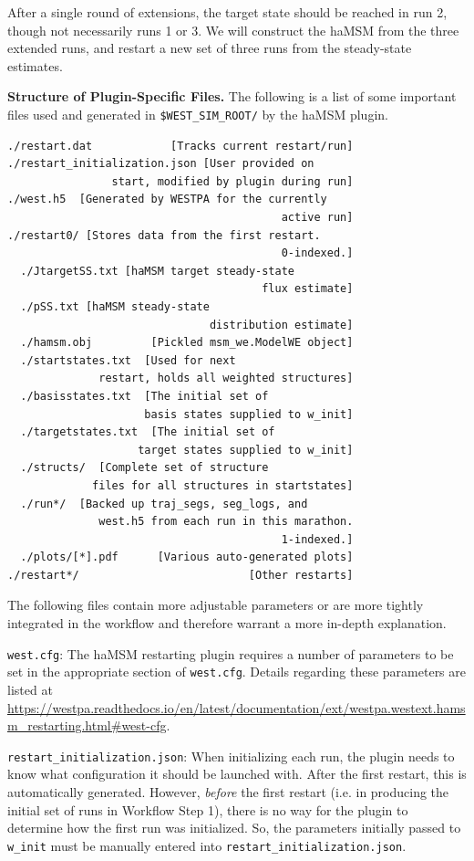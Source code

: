 After a single round of extensions, the target state should be reached in run 2, though not necessarily runs 1 or 3. 
We will construct the haMSM from the three extended runs, and restart a new set of three runs from the steady-state estimates.

\textbf{Structure of Plugin-Specific Files.} The following is a list of some important files used and generated in \verb|$WEST_SIM_ROOT/| by the haMSM plugin.
\pagebreak

\begin{verbatim}
./restart.dat            [Tracks current restart/run]
./restart_initialization.json [User provided on 
                start, modified by plugin during run]
./west.h5  [Generated by WESTPA for the currently 
                                          active run]
./restart0/ [Stores data from the first restart. 
                                          0-indexed.]
  ./JtargetSS.txt [haMSM target steady-state 
                                       flux estimate]
  ./pSS.txt [haMSM steady-state 
                               distribution estimate]
  ./hamsm.obj         [Pickled msm_we.ModelWE object]
  ./startstates.txt  [Used for next 
              restart, holds all weighted structures]
  ./basisstates.txt  [The initial set of 
                     basis states supplied to w_init]
  ./targetstates.txt  [The initial set of 
                    target states supplied to w_init]
  ./structs/  [Complete set of structure 
             files for all structures in startstates]
  ./run*/  [Backed up traj_segs, seg_logs, and 
              west.h5 from each run in this marathon.
                                          1-indexed.]
  ./plots/[*].pdf      [Various auto-generated plots]
./restart*/                          [Other restarts]
\end{verbatim}

The following files contain more adjustable parameters or are more tightly integrated in the workflow and therefore warrant a more in-depth explanation.

\verb|west.cfg|: The haMSM restarting plugin requires a number of parameters to be set in the appropriate section of \verb|west.cfg|. 
Details regarding these parameters are listed at {\url{https://westpa.readthedocs.io/en/latest/documentation/ext/westpa.westext.hamsm_restarting.html#west-cfg}}.

\verb|restart_initialization.json|: When initializing each run, the plugin needs to know what configuration it should be launched with. 
After the first restart, this is automatically generated. 
However, \textit{before} the first restart (i.e. in producing the initial set of runs in Workflow Step 1), there is no way for the plugin to determine how the first run was initialized. 
So, the parameters initially passed to \verb|w_init| must be manually entered into \verb|restart_initialization.json|.

